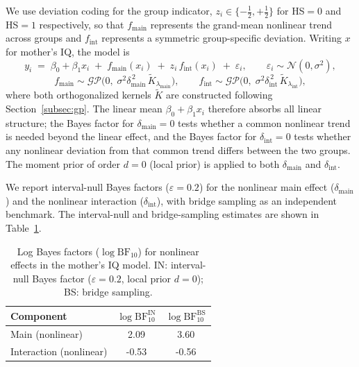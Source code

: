 \documentclass{article}
\begin{document}
We use deviation coding for the group indicator, $z_i\in\{-\tfrac{1}{2},+\tfrac{1}{2}\}$ for HS${}=0$ and HS${}=1$ respectively, so that $f_{\text{main}}$ represents the grand-mean nonlinear trend across groups and $f_{\text{int}}$ represents a symmetric group-specific deviation. Writing $x$ for mother's IQ, the model is
%
\begin{equation}
  y_i \;=\; \beta_0 + \beta_1 x_i
         \;+\; f_{\text{main}}(x_i)
         \;+\; z_i\,f_{\text{int}}(x_i)
         \;+\; \varepsilon_i,
  \qquad
  \varepsilon_i\sim\mathcal{N}(0,\sigma^2),
\end{equation}
%
\begin{equation}
  f_{\text{main}}\sim \mathcal{GP}\!\bigl(0,\;
      \sigma^2\delta_{\text{main}}^{\,2}\,
      \widetilde{K}_{\lambda_{\text{main}}}\bigr),
  \qquad
  f_{\text{int}}\sim \mathcal{GP}\!\bigl(0,\;
      \sigma^2\delta_{\text{int}}^{\,2}\,
      \widetilde{K}_{\lambda_{\text{int}}}\bigr),
\end{equation}
%
where both orthogonalized kernels $\widetilde{K}$ are constructed following Section~\ref{subsec:gp}. The linear mean $\beta_0+\beta_1 x_i$ therefore absorbs all linear structure; the Bayes factor for $\delta_{\text{main}}=0$ tests whether a common nonlinear trend is needed beyond the linear effect, and the Bayes factor for $\delta_{\text{int}}=0$ tests whether any nonlinear deviation from that common trend differs between the two groups. The moment prior of order $d=0$ (local prior) is applied to both $\delta_{\text{main}}$ and $\delta_{\text{int}}$.

We report interval-null Bayes factors ($\varepsilon = 0.2$) for the nonlinear main effect ($\delta_{\text{main}}$) and the nonlinear interaction ($\delta_{\text{int}}$), with bridge sampling as an independent benchmark. The interval-null and bridge-sampling estimates are shown in Table~\ref{tab:bf_education}.

\begin{table}[t]
  \centering
  \caption{Log Bayes factors ($\log\mathrm{BF}_{10}$) for nonlinear effects in the mother's IQ model. IN: interval-null Bayes factor ($\varepsilon = 0.2$, local prior $d=0$); BS: bridge sampling.}
  \label{tab:bf_education}
  \begin{tabular}{lcc}
    \toprule
    Component & $\log\mathrm{BF}_{10}^{\text{IN}}$ & $\log\mathrm{BF}_{10}^{\text{BS}}$ \\
    \midrule
    Main (nonlinear)        & 2.09   & 3.60  \\
    Interaction (nonlinear) & -0.53  & -0.56  \\
    \bottomrule
  \end{tabular}
\end{table}
\end{document}
